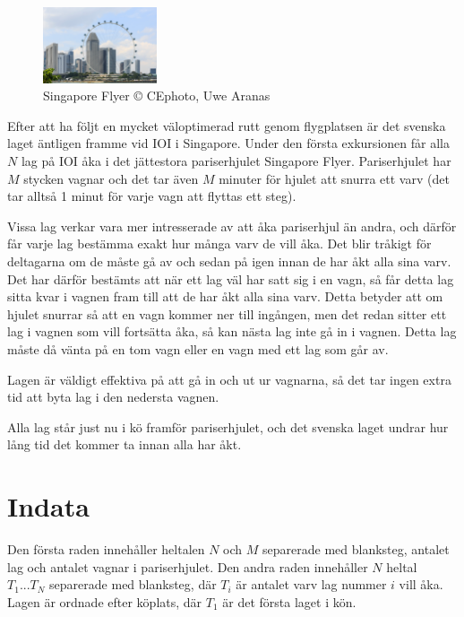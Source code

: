 \begin{figure}
	\includegraphics[width=0.3\textwidth]{image}
	\caption{\centering Singapore Flyer \newline © CEphoto, Uwe Aranas}
\end{figure}

Efter att ha följt en mycket väloptimerad rutt genom flygplatsen är det svenska laget äntligen framme vid IOI i Singapore.
Under den första exkursionen får alla $N$ lag på IOI åka i det jättestora pariserhjulet Singapore Flyer.
Pariserhjulet har $M$ stycken vagnar och det tar även $M$ minuter för hjulet att snurra ett varv
(det tar alltså 1 minut för varje vagn att flyttas ett steg).

Vissa lag verkar vara mer intresserade av att åka pariserhjul än andra, och därför får varje lag bestämma exakt hur många varv de vill åka.
Det blir tråkigt för deltagarna om de måste gå av och sedan på igen innan de har åkt alla sina varv.
Det har därför bestämts att när ett lag väl har satt sig i en vagn, så får detta lag sitta kvar i vagnen fram till att de har åkt alla sina varv.
Detta betyder att om hjulet snurrar så att en vagn kommer ner till ingången, men det redan sitter ett lag i vagnen som vill fortsätta åka,
så kan nästa lag inte gå in i vagnen. Detta lag måste då vänta på en tom vagn eller en vagn med ett lag som går av.

Lagen är väldigt effektiva på att gå in och ut ur vagnarna, så det tar ingen extra tid att byta lag i den nedersta vagnen.

Alla lag står just nu i kö framför pariserhjulet, och det svenska laget undrar hur lång tid det kommer ta innan alla har åkt.

\section*{Indata}
Den första raden innehåller heltalen $N$ och $M$ separerade med blanksteg,
antalet lag och antalet vagnar i pariserhjulet.
Den andra raden innehåller $N$ heltal $T_1 ... T_N$ separerade med blanksteg,
där $T_i$ är antalet varv lag nummer $i$ vill åka. Lagen är ordnade efter
köplats, där $T_1$ är det första laget i kön.

